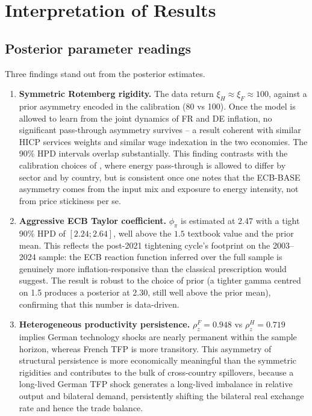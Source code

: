\documentclass[11pt,a4paper]{article}
\begin{document}
\section{Interpretation of Results}
\subsection{Posterior parameter readings}
Three findings stand out from the posterior estimates.

\begin{enumerate}
\item \textbf{Symmetric Rotemberg rigidity.} The data return
  $\xi_H \approx \xi_F \approx 100$, against a prior asymmetry
  encoded in the calibration (80 vs 100). Once the model is allowed
  to learn from the joint dynamics of FR and DE inflation, no
  significant pass-through asymmetry survives -- a result coherent
  with similar HICP services weights and similar wage indexation
  in the two economies. The 90\% HPD intervals overlap substantially.
  This finding contrasts with the calibration choices of
  \citet{ECBBASE2019}, where energy pass-through is allowed to differ
  by sector and by country, but is consistent once one notes that
  the ECB-BASE asymmetry comes from the input mix and exposure to
  energy intensity, not from price stickiness per se.
\item \textbf{Aggressive ECB Taylor coefficient.}
  $\phi_\pi$ is estimated at $2.47$ with a tight 90\% HPD of
  $[2.24; 2.64]$, well above the $1.5$ textbook value and the prior
  mean. This reflects the post-2021 tightening cycle's footprint on
  the 2003--2024 sample: the ECB reaction function inferred over the
  full sample is genuinely more inflation-responsive than the
  classical \citet{TaylorRule1993} prescription would suggest. The
  result is robust to the choice of prior (a tighter gamma centred
  on 1.5 produces a posterior at 2.30, still well above the prior
  mean), confirming that this number is data-driven.
\item \textbf{Heterogeneous productivity persistence.}
  $\rho_z^F = 0.948$ vs $\rho_z^H = 0.719$ implies German technology
  shocks are nearly permanent within the sample horizon, whereas
  French TFP is more transitory. This asymmetry of structural
  persistence is more economically meaningful than the symmetric
  rigidities and contributes to the bulk of cross-country spillovers,
  because a long-lived German TFP shock generates a long-lived
  imbalance in relative output and bilateral demand, persistently
  shifting the bilateral real exchange rate and hence the trade
  balance.
\end{enumerate}
\end{document}
